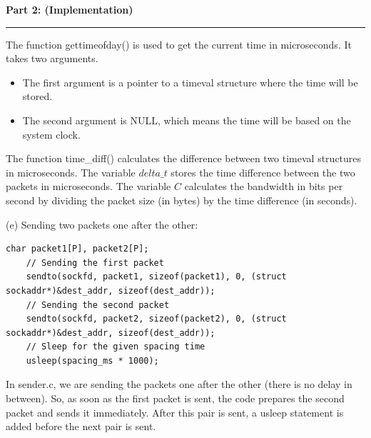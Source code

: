 \documentclass[a4paper,12pt]{article}
\newenvironment{solution}[2][]{%
    \begin{mdframed}[linecolor=blue!70!black, linewidth=2pt, roundcorner=10pt, backgroundcolor=yellow!10!white, skipabove=12pt, skipbelow=12pt]%
        \textbf{\large #2}
        \par\noindent\rule{\textwidth}{0.4pt}
}{
    \end{mdframed}
}
\begin{document}
\begin{solution}{Part 2: (Implementation)}
The function gettimeofday() is used to get the current time in microseconds. It takes two arguments.
\begin{itemize}
    \item The first argument is a pointer to a timeval structure where the time will be stored.
    \item The second argument is NULL, which means the time will be based on the system clock.
\end{itemize}
The function time\_diff() calculates the difference between two timeval structures in microseconds. The variable $delta\_t$ stores the time difference between the two packets in microseconds. The variable $C$ calculates the bandwidth in bits per second by dividing the packet size (in bytes) by the time difference (in seconds).


(e) Sending two packets one after the other:
\begin{lstlisting}[caption=Sending two packets one after the other]
    char packet1[P], packet2[P];
    // Sending the first packet
    sendto(sockfd, packet1, sizeof(packet1), 0, (struct sockaddr*)&dest_addr, sizeof(dest_addr));
    // Sending the second packet
    sendto(sockfd, packet2, sizeof(packet2), 0, (struct sockaddr*)&dest_addr, sizeof(dest_addr));
    // Sleep for the given spacing time
    usleep(spacing_ms * 1000);
\end{lstlisting}

In sender.c, we are sending the packets one after the other (there is no delay in between). So, as soon as the first packet is sent, the code prepares the second packet and sends it immediately. After this pair is sent, a usleep statement is added before the next pair is sent. 
\end{solution}
\end{document}
